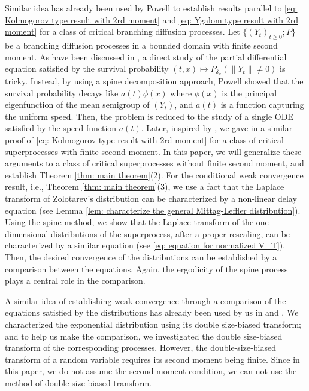 \documentclass[12pt, a4paper]{amsart}
\theoremstyle{definition}
\numberwithin{equation}{section}
\begin{document}
	Similar idea
	has already been used by Powell \cite{Powell2015An-invariance} to establish results parallel to \eqref{eq: Kolmogorov type result with 2rd moment} and \eqref{eq: Ygalom type result with 2rd moment} for a class of critical branching diffusion processes.
    Let $\{(Y_t)_{t\geq 0}; P\}$
	be a branching diffusion processes in a bounded domain with finite second moment.
	As have been discussed in \cite{Powell2015An-invariance}, a direct study of the partial differential equation
	satisfied by the survival probability
$(t,x) \mapsto P_{\delta_x}(\|Y_t\| \neq 0)$ is tricky.
	Instead, by using a spine decomposition approach, Powell \cite{Powell2015An-invariance} showed that the survival probability decays like $a(t)\phi(x)$ where $\phi(x)$ is the principal eigenfunction of the mean semigroup of $(Y_t)$, and $a(t)$ is a function capturing the uniform speed.
	Then, the problem is reduced to the study of a single ODE satisfied by the speed function $a(t)$.
	Later, inspired by \cite{Powell2015An-invariance}, we gave in \cite{RenSongSun2017Spine} a similar proof of \eqref{eq: Kolmogorov type result with 2rd moment} for a class of critical superprocesses with finite second moment.
	In this paper, we will  generalize these arguments to a class of critical superprocesses without finite second moment, and establish Theorem \ref{thm: main theorem}(2).
	For the conditional weak convergence result, i.e., Theorem \ref{thm: main theorem}(3), we use a fact that the Laplace transform of Zolotarev's distribution can be characterized by a non-linear delay equation (see Lemma \ref{lem: characterize the general Mittag-Leffler distribution}).
	Using the spine method, we show that the Laplace transform of
		the one-dimensional distributions
	of the superprocess, after a proper rescaling,
	can be 	characterized by a similar equation (see \eqref{eq: equation for normalized V_T}).
	Then, the desired convergence of the distributions can be established by a comparison between the equations.	
	Again, the ergodicity of the spine process plays a central role in the comparison.
	
		A similar idea of establishing weak convergence through a comparison of the equations satisfied by the distributions has already been used by us in \cite{RenSongSun2017A-2-spine} and \cite{RenSongSun2017Spine}.
	We characterized the exponential distribution
		using its double size-biased transform;
	and to help us make the comparison, we investigated the double size-biased transform of the corresponding processes.
	However, the
	double-size-biased transform of a random variable requires its second moment being finite.
	Since in this paper, we do not assume the second moment condition, we can not use the method of double size-biased transform.
		
\end{document}
